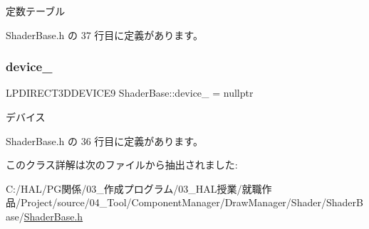定数テーブル 



 Shader\+Base.\+h の 37 行目に定義があります。

\mbox{\label{class_shader_base_a15e4a4c1c1148433b9a0c60a7c32a366}} 
\subsubsection{\texorpdfstring{device\+\_\+}{device\_}}
{\footnotesize\ttfamily L\+P\+D\+I\+R\+E\+C\+T3\+D\+D\+E\+V\+I\+C\+E9 Shader\+Base\+::device\+\_\+ = nullptr\hspace{0.3cm}{\ttfamily [private]}}



デバイス 



 Shader\+Base.\+h の 36 行目に定義があります。



このクラス詳解は次のファイルから抽出されました\+:\begin{DoxyCompactItemize}
\item 
C\+:/\+H\+A\+L/\+P\+G関係/03\+\_\+作成プログラム/03\+\_\+\+H\+A\+L授業/就職作品/\+Project/source/04\+\_\+\+Tool/\+Component\+Manager/\+Draw\+Manager/\+Shader/\+Shader\+Base/\mbox{\hyperlink{_shader_base_8h}{Shader\+Base.\+h}}\end{DoxyCompactItemize}
